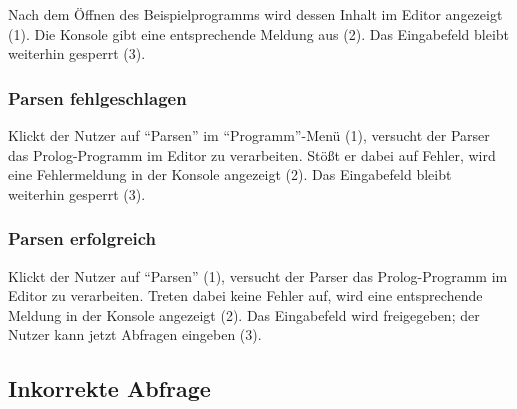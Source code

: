 \documentclass[parskip=full,11pt,twoside]{scrartcl}
\begin{document}
Nach dem Öffnen des Beispielprogramms wird dessen Inhalt im Editor angezeigt (1).
Die Konsole gibt eine entsprechende Meldung aus (2).
Das Eingabefeld bleibt weiterhin gesperrt (3).

\subsubsection{Parsen fehlgeschlagen}

\begin{minipage}{\linewidth}
\end{minipage}

Klickt der Nutzer auf \enquote{Parsen} im \enquote{Programm}-Menü (1), versucht der Parser das Prolog-Programm im Editor zu verarbeiten.
Stößt er dabei auf Fehler, wird eine Fehlermeldung in der Konsole angezeigt (2).
Das Eingabefeld bleibt weiterhin gesperrt (3).

\subsubsection{Parsen erfolgreich}

\begin{minipage}{\linewidth}
\end{minipage}

Klickt der Nutzer auf \enquote{Parsen} (1), versucht der Parser das Prolog-Programm im Editor zu verarbeiten.
Treten dabei keine Fehler auf, wird eine entsprechende Meldung in der Konsole angezeigt (2).
Das Eingabefeld wird freigegeben; der Nutzer kann jetzt Abfragen eingeben (3).

\subsection{Inkorrekte Abfrage}

\begin{minipage}{\linewidth}
\end{minipage}
\end{document}
